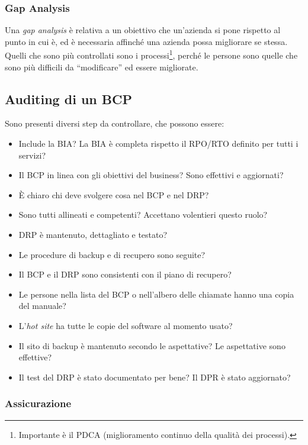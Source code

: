 \subsubsection{Gap Analysis}

Una \textit{gap analysis} è relativa a un obiettivo che un'azienda si pone
rispetto al punto in cui è, ed è necessaria affinché una azienda possa
migliorare se stessa. Quelli che sono più controllati sono i
processi\footnote{Importante è il PDCA (miglioramento continuo della qualità
dei processi).}, perché le persone sono quelle che sono più difficili da
``modificare'' ed essere migliorate.

\subsection{Auditing di un BCP}

Sono presenti diversi step da controllare, che possono essere:
\begin{itemize}
  \item Include la BIA? La BIA è completa rispetto il RPO/RTO definito per 
  tutti i servizi?
  \item Il BCP in linea con gli obiettivi del business? Sono effettivi e 
  aggiornati?
  \item È chiaro chi deve svolgere cosa nel BCP e nel DRP?
  \item Sono tutti allineati e competenti? Accettano volentieri questo ruolo?
  \item DRP è mantenuto, dettagliato e testato?
  \item Le procedure di backup e di recupero sono seguite?
  \item Il BCP e il DRP sono consistenti con il piano di recupero?
  \item Le persone nella lista del BCP o nell'albero delle chiamate hanno una
  copia del manuale?
  \item L'\textit{hot site} ha tutte le copie del software al momento usato?
  \item Il sito di backup è mantenuto secondo le aspettative? Le 
  aspettative sono effettive?
  \item Il test del DRP è stato documentato per bene? Il DPR è stato 
  aggiornato?
\end{itemize}

\subsubsection{Assicurazione}

